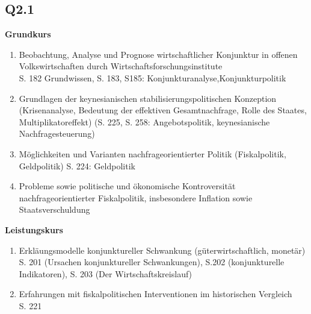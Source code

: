 \documentclass[12pt, letterpaper]{article}
\begin{document}
\subsection{Q2.1}
\label{sec:Q2.1}
\textbf{Grundkurs} 
\begin{enumerate}
  \item Beobachtung, Analyse und Prognose wirtschaftlicher Konjunktur in offenen Volkswirtschaften durch Wirtschaftsforschungsinstitute\\
    S. 182 Grundwissen, S. 183, S185: Konjunkturanalyse,Konjunkturpolitik
    \item Grundlagen der keynesianischen stabilisierungspolitischen Konzeption (Krisenanalyse, Bedeutung der effektiven Gesamtnachfrage, Rolle des Staates, Multiplikatoreffekt) (S. 225, S. 258: Angebotspolitik, keynesianische Nachfragesteuerung)
    \item Möglichkeiten und Varianten nachfrageorientierter Politik (Fiskalpolitik, Geldpolitik) S. 224: Geldpolitik
    
    \item Probleme sowie politische und ökonomische Kontroversität nachfrageorientierter Fiskalpolitik, insbesondere Inflation sowie Staatsverschuldung\\
\end{enumerate}
\textbf{Leistungskurs} 
\begin{enumerate}
  \item Erkläungsmodelle konjunktureller Schwankung (güterwirtschaftlich, monetär)\\
    S. 201 (Ursachen konjunktureller Schwankungen), S.202 (konjunkturelle Indikatoren), S. 203 (Der Wirtschaftskreislauf)
  \item Erfahrungen mit fiskalpolitischen Interventionen im historischen Vergleich\\ S. 221
\end{enumerate}
\end{document}
